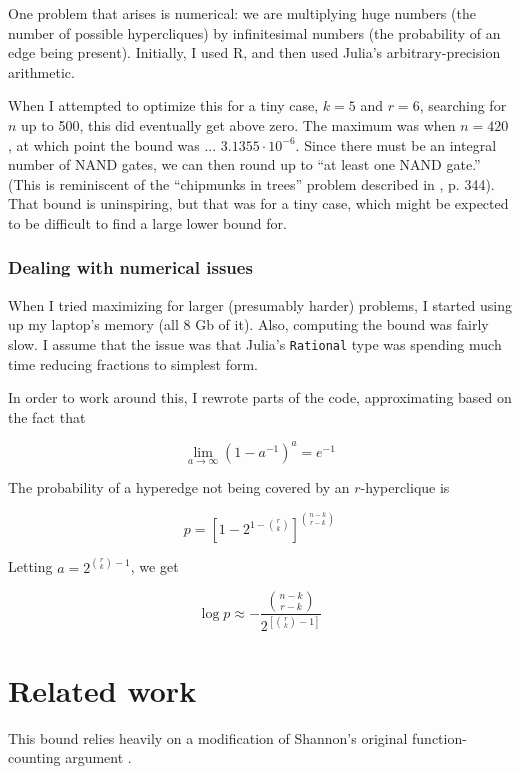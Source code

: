 \documentclass[12pt]{article}
\theoremstyle{definition}
\begin{document}
One problem that arises is numerical: we are multiplying huge numbers
(the number of possible hypercliques) by infinitesimal numbers
(the probability of an edge being present). Initially, I used R, and
then used Julia's arbitrary-precision arithmetic.

When I attempted to optimize this for a tiny case, $k=5$ and $r=6$,
searching for $n$ up to 500,
this did eventually get above zero.
The maximum was when $n=420$, at which point the bound was
... $3.1355 \cdot 10^{-6}$.
Since there must be an integral number of NAND gates, we can then round up
to ``at least one NAND gate.''
(This is reminiscent of the ``chipmunks in trees''
problem described in \cite{ross2006first}, p. 344).
That bound is uninspiring, but that was for a tiny case, which might be
expected to be difficult to find a large lower bound for.

\subsubsection{Dealing with numerical issues}

When I tried maximizing for larger (presumably harder)
problems, I started using up my laptop's
memory (all 8 Gb of it). Also, computing the bound
was fairly slow. I assume that the
issue was that Julia's {\tt Rational} type was spending much time reducing
fractions to simplest form.

In order to work around this, I rewrote parts of the code,
approximating based on the fact that

\[
\lim_{a\to\infty} (1 - a^{-1})^{a} = e^{-1}
\]

The probability of a hyperedge not being covered by an $r$-hyperclique is

\[
p = [1 - 2 ^ {1-{r \choose k}}] ^ {n-k \choose r-k}
\]

Letting $a = 2^{{r \choose k}-1}$, we get

\[
\log p \approx - \frac{{n-k \choose r-k}} {2^{[{r \choose k}-1]}}
\]





\section{Related work}

This bound relies heavily on a modification of Shannon's original
function-counting argument \cite{shannon_synthesis_1949}.
\end{document}
